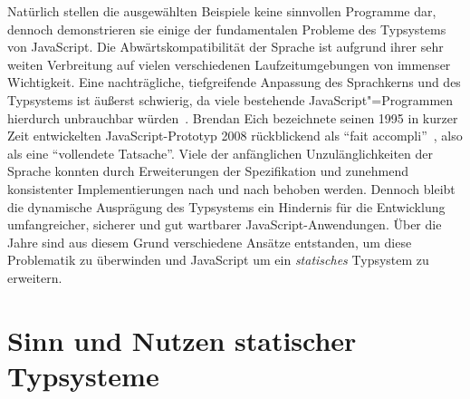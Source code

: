 Natürlich stellen die ausgewählten Beispiele keine sinnvollen Programme dar, dennoch demonstrieren sie einige der fundamentalen Probleme des Typsystems von JavaScript. Die Abwärtskompatibilität der Sprache ist aufgrund ihrer sehr weiten Verbreitung auf vielen verschiedenen Laufzeitumgebungen von immenser Wichtigkeit. Eine nachträgliche, tiefgreifende Anpassung des Sprachkerns und des Typsystems ist äußerst schwierig, da viele bestehende JavaScript"=Programmen hierdurch unbrauchbar würden~\autocite[1]{CROCKFORD:JS_GOOD_PARTS}. Brendan Eich bezeichnete seinen 1995 in kurzer Zeit entwickelten JavaScript-Prototyp 2008 rückblickend als \enquote{fait accompli}~\autocite{EICH:POPULARITY}, also als eine \enquote{vollendete Tatsache}. Viele der anfänglichen Unzulänglichkeiten der Sprache konnten durch Erweiterungen der Spezifikation und zunehmend konsistenter Implementierungen nach und nach behoben werden. Dennoch bleibt die dynamische Ausprägung des Typsystems ein Hindernis für die Entwicklung umfangreicher, sicherer und gut wartbarer JavaScript-Anwendungen. Über die Jahre sind aus diesem Grund verschiedene Ansätze entstanden, um diese Problematik zu überwinden und JavaScript um ein \emph{statisches} Typsystem zu erweitern.

\section{Sinn und Nutzen statischer Typsysteme}

